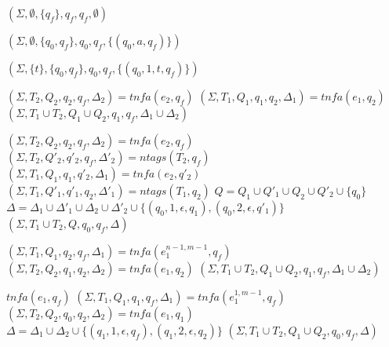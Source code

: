\documentclass[]{article}
\let\oldnl\nl%
\newcommand{\nonl}{\renewcommand{\nl}{\let\nl\oldnl}}%
\newcommand{\XN}{\mathcal{N}}
\newcommand{\YN}{\mathbb{N}}
\begin{document}
\begin{algorithm}[] \DontPrintSemicolon {}
\begin{multicols}{2}

    \newcommand \retonfa {tn\!f\!a}%
    \newcommand \ntag {ntags}
    \Indm
    \small

    \nonl\Fn {$\underline{\retonfa(e, q_f)} \smallskip$} {

     {
        \Return $(\Sigma, \emptyset, \{q_f\}, q_f, q_f, \emptyset)$
    }
    \BlankLine
    \BlankLine

     {
        \Return $(\Sigma, \emptyset, \{q_0,q_f\}, q_0, q_f, \{(q_0, a, q_f)\})$
    }
    \BlankLine
    \BlankLine

    \ElseIf {$e = t \in \YN$} {
        \Return $(\Sigma, \{t\}, \{q_0, q_f\}, q_0, q_f, \{(q_0, 1, t, q_f)\})$
    }
    \BlankLine
    \BlankLine

     {
        $(\Sigma, T_2, Q_2, q_2, q_f, \Delta_2) = \retonfa (e_2, q_f)$ \;
        $(\Sigma, T_1, Q_1, q_1, q_2, \Delta_1) = \retonfa (e_1, q_2)$ \;
        \Return $(\Sigma, T_1 \cup T_2, Q_1 \cup Q_2, q_1, q_f, \Delta_1 \cup \Delta_2)$
    }
    \BlankLine
    \BlankLine

     {
        $(\Sigma, T_2, Q_2, q_2, q_f, \Delta_2) = \retonfa (e_2, q_f)$ \;
        $(\Sigma, T_2, Q'_2, q'_2, q_f, \Delta'_2) = \ntag (T_2, q_f)$ \;
        $(\Sigma, T_1, Q_1, q_1, q'_2, \Delta_1) = \retonfa (e_2, q'_2)$ \;
        $(\Sigma, T_1, Q'_1, q'_1, q_2, \Delta'_1) = \ntag (T_1, q_2)$ \;
        $Q = Q_1 \cup Q'_1 \cup Q_2 \cup Q'_2 \cup \{q_0\}$ \;
        $\Delta = \Delta_1 \cup \Delta'_1 \cup \Delta_2 \cup \Delta'_2 \cup \{ (q_0,1,\epsilon,q_1), (q_0,2,\epsilon,q'_1) \}$ \;
        \Return $(\Sigma, T_1 \cup T_2, Q, q_0, q_f, \Delta)$
    }
    \BlankLine
    \BlankLine

     {
        $(\Sigma, T_1, Q_1, q_2, q_f, \Delta_1) = \retonfa(e_1^{n\!-\!1, m\!-\!1}, q_f)$ \;
        $(\Sigma, T_2, Q_2, q_1, q_2, \Delta_2) = \retonfa(e_1, q_2)$ \;
        \Return $(\Sigma, T_1 \cup T_2, Q_1 \cup Q_2, q_1, q_f, \Delta_1 \cup \Delta_2)$
    }
    \BlankLine
    \BlankLine

     {
         {
            \Return $\retonfa (e_1, q_f)$
        }
        $(\Sigma, T_1, Q_1, q_1, q_f, \Delta_1) = \retonfa (e_1^{1, m\!-\!1}, q_f)$ \;
        $(\Sigma, T_2, Q_2, q_0, q_2, \Delta_2) = \retonfa (e_1, q_1)$ \;
        $\Delta = \Delta_1 \cup \Delta_2 \cup \{ (q_1, 1, \epsilon, q_f), (q_1, 2, \epsilon, q_2) \}$ \;
        \Return $(\Sigma, T_1 \cup T_2, Q_1 \cup Q_2, q_0, q_f, \Delta)$
    }
    \BlankLine
    \BlankLine

}
\end{multicols}
\end{algorithm}
\end{document}
